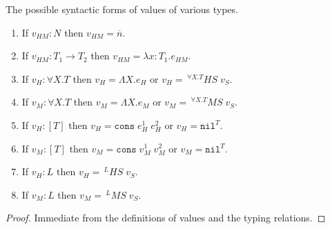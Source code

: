 \begin{lemma}
\label{cf}
\onehalfspacing
The possible syntactic forms of values of various types.
\begin{enumerate}
\item If $v_{HM}:N$ then $v_{HM}=\overline{n}$.
\item If $v_{HM}:T_{1}\rightarrow T_{2}$ then $v_{HM}=\lambda x:T_{1}.e_{HM}$.
\item If $v_{H}:\forall X.T$ then $v_{H}=\Lambda X.e_{H}$ or $v_{H}=\,^{\forall X.T}HS\;v_{S}$.
\item If $v_{M}:\forall X.T$ then $v_{M}=\Lambda X.e_{M}$ or $v_{M}=\,^{\forall X.T}MS\;v_{S}$.
\item If $v_{H}:[T]$ then $v_{H}=\mathtt{cons}\;e_{H}^{1}\;e_{H}^{2}$ or $v_{H}=\mathtt{nil}^{T}$.
\item If $v_{M}:[T]$ then $v_{M}=\mathtt{cons}\;v_{M}^{1}\;v_{M}^{2}$ or $v_{M}=\mathtt{nil}^{T}$.
\item If $v_{H}:L$ then $v_{H}=\,^{L}HS\;v_{S}$.
\item If $v_{M}:L$ then $v_{M}=\,^{L}MS\;v_{S}$.
\end{enumerate}
\begin{proof}
Immediate from the definitions of values and the typing relations.
\end{proof}
\end{lemma}